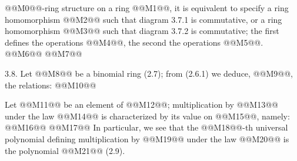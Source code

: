 @@M0@@-ring structure on a ring @@M1@@, it is equivalent to specify a ring homomorphism @@M2@@ such that diagram 3.7.1 is commutative, or a ring homomorphism @@M3@@ such that diagram 3.7.2 is commutative; the first defines the operations @@M4@@, the second the operations @@M5@@.
@@M6@@
@@M7@@

3.8. Let @@M8@@ be a binomial ring (2.7); from (2.6.1) we deduce, @@M9@@, the relations:
@@M10@@

Let @@M11@@ be an element of @@M12@@; multiplication by @@M13@@ under the law @@M14@@ is characterized by its value on @@M15@@, namely:
@@M16@@
@@M17@@
In particular, we see that the @@M18@@-th universal polynomial defining multiplication by @@M19@@ under the law @@M20@@ is the polynomial @@M21@@ (2.9).

